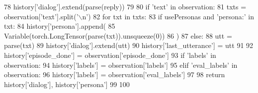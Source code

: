 \begin{DoxyCode}
78                 history[\textcolor{stringliteral}{'dialog'}].extend(parse(reply))
79 
80     \textcolor{keywordflow}{if} \textcolor{stringliteral}{'text'} \textcolor{keywordflow}{in} observation:
81         txts = observation[\textcolor{stringliteral}{'text'}].split(\textcolor{stringliteral}{'\(\backslash\)n'})
82         \textcolor{keywordflow}{for} txt \textcolor{keywordflow}{in} txts:
83             \textcolor{keywordflow}{if} usePersonas \textcolor{keywordflow}{and} \textcolor{stringliteral}{'persona:'} \textcolor{keywordflow}{in} txt:
84                 history[\textcolor{stringliteral}{'persona'}].append(
85                     Variable(torch.LongTensor(parse(txt)).unsqueeze(0))
86                 )
87             \textcolor{keywordflow}{else}:
88                 utt = parse(txt)
89                 history[\textcolor{stringliteral}{'dialog'}].extend(utt)
90                 history[\textcolor{stringliteral}{'last\_utterance'}] = utt
91 
92     history[\textcolor{stringliteral}{'episode\_done'}] = observation[\textcolor{stringliteral}{'episode\_done'}]
93     \textcolor{keywordflow}{if} \textcolor{stringliteral}{'labels'} \textcolor{keywordflow}{in} observation:
94         history[\textcolor{stringliteral}{'labels'}] = observation[\textcolor{stringliteral}{'labels'}]
95     \textcolor{keywordflow}{elif} \textcolor{stringliteral}{'eval\_labels'} \textcolor{keywordflow}{in} observation:
96         history[\textcolor{stringliteral}{'labels'}] = observation[\textcolor{stringliteral}{'eval\_labels'}]
97 
98     \textcolor{keywordflow}{return} history[\textcolor{stringliteral}{'dialog'}], history[\textcolor{stringliteral}{'persona'}]
99 
100 
\end{DoxyCode}
